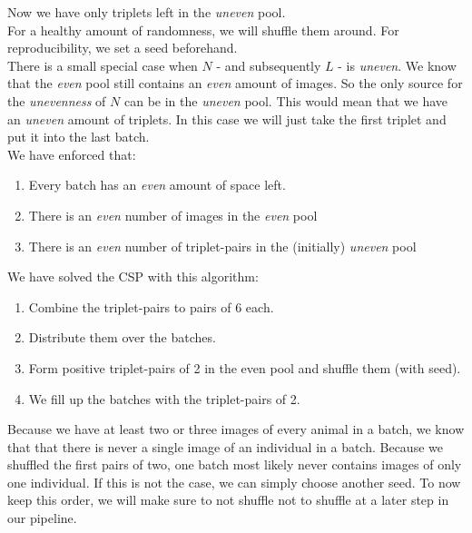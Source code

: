 \noindent Now we have only triplets left in the \textit{uneven} pool. \\
For a healthy amount of randomness, we will shuffle them around. For reproducibility, we set a seed beforehand. \\

\noindent There is a small special case when $N$ - and subsequently $L$ - is \textit{uneven}. We know that the \textit{even} pool still contains an \textit{even} amount of images. So the only source for the \textit{unevenness} of $N$ can be in the \textit{uneven} pool. This would mean that we have an \textit{uneven} amount of triplets. In this case we will just take the first triplet and put it into the last batch.\\

\noindent We have enforced that:
\begin{enumerate}
    \item Every batch has an \textit{even} amount of space left.
    \item There is an \textit{even} number of images in the \textit{even} pool
    \item There is an \textit{even} number of triplet-pairs in the (initially) \textit{uneven} pool 
\end{enumerate}

\noindent We have solved the CSP with this algorithm:

\begin{enumerate}
    \item Combine the triplet-pairs to pairs of 6 each.
    \item Distribute them over the batches.
    \item Form positive triplet-pairs of 2 in the even pool and shuffle them (with seed).
    \item We fill up the batches with the triplet-pairs of 2.
\end{enumerate}

\noindent Because we have at least two or three images of every animal in a batch, we know that that there is never a single image of an individual in a batch. Because we shuffled the first pairs of two, one batch most likely never contains images of only one individual. If this is not the case, we can simply choose another seed. To now keep this order, we will make sure to not shuffle not to shuffle at a later step in our pipeline.
